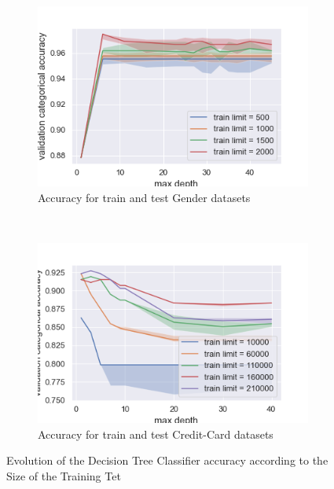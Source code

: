 \documentclass[10pt]{article}
\begin{document}
		\paragraph*{}
			\begin{figure}[h]
				\centering
				\begin{subfigure}[]{0.45\columnwidth}
					\centering
					\includegraphics[width=\linewidth]{../graphics/tree_gender_max_depth_score_type_train_limit.png}
					\caption{Accuracy for train and test Gender datasets}
					\label{tree:gender_train_size_score_type_score_type}
				\end{subfigure}
				~
				\begin{subfigure}[]{0.45\columnwidth}
					\centering
					\includegraphics[width=\linewidth]{../graphics/tree_creditcard_max_depth_score_type_train_limit.png}
					\caption{Accuracy for train and test Credit-Card datasets}
					\label{tree:creditcard_train_size_score_type_score_type}
				\end{subfigure}
				\caption{Evolution of the Decision Tree Classifier accuracy according to the Size of the Training Tet}
				\label{tree:train_size_score_type_score_type}
			\end{figure}
\end{document}
